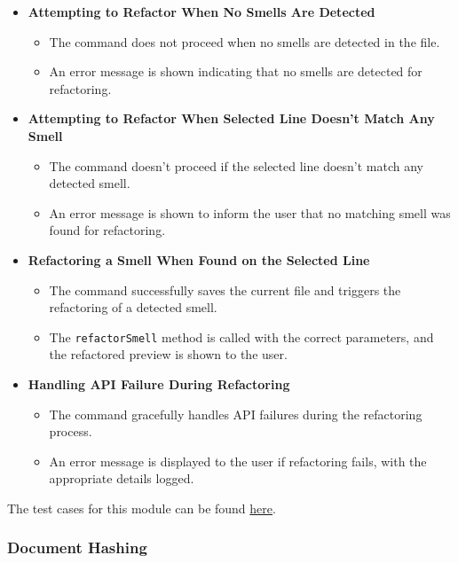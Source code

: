 \documentclass[12pt, titlepage]{article}
\begin{document}
\begin{enumerate}[label={\bf \textcolor{Maroon}{test-SRT-\arabic*}}, wide=0pt, font=\itshape]
\begin{itemize}
    \item \textbf{Attempting to Refactor When No Smells Are Detected}
    \begin{itemize}
        \item The command does not proceed when no smells are detected in the file.
        \item An error message is shown indicating that no smells are detected for refactoring.
    \end{itemize}

    \item \textbf{Attempting to Refactor When Selected Line Doesn’t Match Any Smell}
    \begin{itemize}
        \item The command doesn't proceed if the selected line doesn't match any detected smell.
        \item An error message is shown to inform the user that no matching smell was found for refactoring.
    \end{itemize}

    \item \textbf{Refactoring a Smell When Found on the Selected Line}
    \begin{itemize}
        \item The command successfully saves the current file and triggers the refactoring of a detected smell.
        \item The \texttt{refactorSmell} method is called with the correct parameters, and the refactored preview is shown to the user.
    \end{itemize}

    \item \textbf{Handling API Failure During Refactoring}
    \begin{itemize}
        \item The command gracefully handles API failures during the refactoring process.
        \item An error message is displayed to the user if refactoring fails, with the appropriate details logged.
    \end{itemize}
\end{itemize}

\noindent The test cases for this module can be found \href{https://github.com/ssm-lab/capstone--sco-vs-code-plugin/blob/plugin-multi-file/test/commands/refactorSmell.test.ts}{here}.

\subsubsection{Document Hashing}


\end{enumerate}
\end{document}
